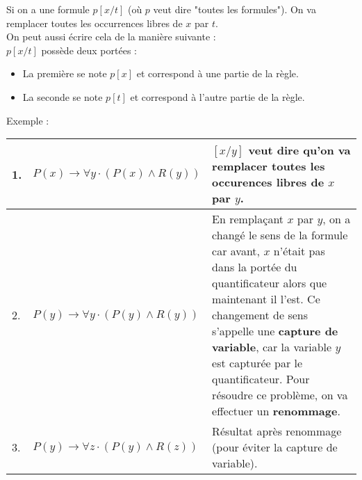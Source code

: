 Si on a une formule $p[x/t]$ (où $p$ veut dire "toutes les formules"). On va remplacer toutes les occurrences libres de $x$ par $t$.\\
On peut aussi écrire cela de la manière suivante :\\

$p[x/t]$ possède deux portées :
\begin{itemize}
\item[] La première se note $p[x]$ et correspond à une partie de la règle.
\item[] La seconde se note $p[t]$ et correspond à l'autre partie de la règle.\\
\end{itemize}

Exemple :
\begin{center}
\begin{tabular}{|l |l |>{\raggedright}m{6cm}|}
\hline
1. &$P(x) \rightarrow \forall y \cdot (P(x) \wedge R(y))$&$[x/y]$ veut dire qu'on va remplacer toutes les occurences libres de $x$ par $y$.\tabularnewline
\hline
2. &$P(y) \rightarrow \forall y \cdot (P(y) \wedge R(y))$&En remplaçant $x$ par $y$, on a changé le sens de la formule car avant, $x$ n'était pas dans la portée du quantificateur alors que maintenant il l'est. Ce changement de sens s'appelle une \textbf{capture de variable}, car la variable $y$ est capturée par le quantificateur. Pour résoudre ce problème, on va effectuer un \textbf{renommage}.\tabularnewline
\hline
3. &$P(y) \rightarrow \forall z \cdot (P(y) \wedge R(z))$&Résultat après renommage (pour éviter la capture de variable).\tabularnewline
\hline
\end{tabular}
\end{center}

% 
